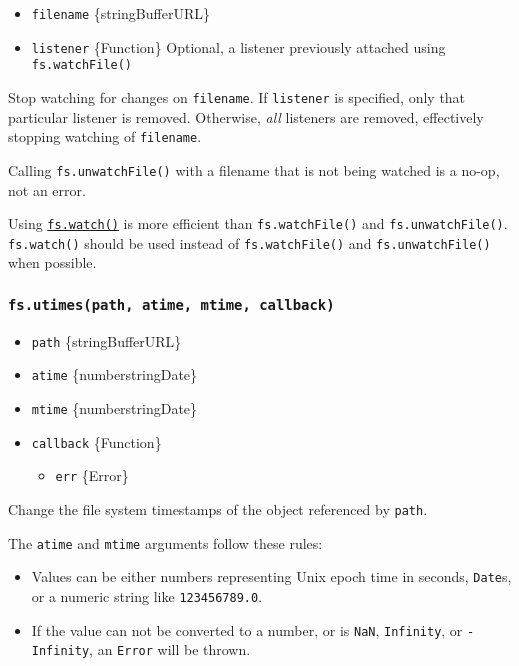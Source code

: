 \begin{itemize}
\tightlist
\item
  \texttt{filename} \{string\textbar Buffer\textbar URL\}
\item
  \texttt{listener} \{Function\} Optional, a listener previously
  attached using \texttt{fs.watchFile()}
\end{itemize}

Stop watching for changes on \texttt{filename}. If \texttt{listener} is
specified, only that particular listener is removed. Otherwise,
\emph{all} listeners are removed, effectively stopping watching of
\texttt{filename}.

Calling \texttt{fs.unwatchFile()} with a filename that is not being
watched is a no-op, not an error.

Using \hyperref[fswatchfilename-options-listener]{\texttt{fs.watch()}}
is more efficient than \texttt{fs.watchFile()} and
\texttt{fs.unwatchFile()}. \texttt{fs.watch()} should be used instead of
\texttt{fs.watchFile()} and \texttt{fs.unwatchFile()} when possible.

\subsubsection{\texorpdfstring{\texttt{fs.utimes(path,\ atime,\ mtime,\ callback)}}{fs.utimes(path, atime, mtime, callback)}}\label{fs.utimespath-atime-mtime-callback}

\begin{itemize}
\tightlist
\item
  \texttt{path} \{string\textbar Buffer\textbar URL\}
\item
  \texttt{atime} \{number\textbar string\textbar Date\}
\item
  \texttt{mtime} \{number\textbar string\textbar Date\}
\item
  \texttt{callback} \{Function\}

  \begin{itemize}
  \tightlist
  \item
    \texttt{err} \{Error\}
  \end{itemize}
\end{itemize}

Change the file system timestamps of the object referenced by
\texttt{path}.

The \texttt{atime} and \texttt{mtime} arguments follow these rules:

\begin{itemize}
\tightlist
\item
  Values can be either numbers representing Unix epoch time in seconds,
  \texttt{Date}s, or a numeric string like
  \texttt{\textquotesingle{}123456789.0\textquotesingle{}}.
\item
  If the value can not be converted to a number, or is \texttt{NaN},
  \texttt{Infinity}, or \texttt{-Infinity}, an \texttt{Error} will be
  thrown.
\end{itemize}


